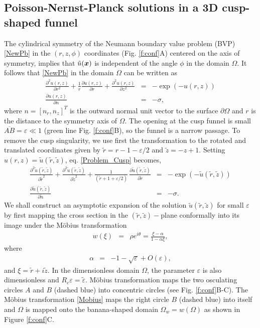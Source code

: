 \documentclass[12pt]{article}
\newcommand{\ds}{\displaystyle}
\newcommand{\beq}{\begin{eqnarray}}
\newcommand{\eeq}{\end{eqnarray}}
\newcommand{\p}{\partial}
\newcommand{\eps}{\varepsilon}
\newcommand{\x}{\mbox{\boldmath$x$}}
\begin{document}
\subsection{Poisson-Nernst-Planck solutions in a 3D cusp-shaped funnel}\label{s:Reduction_cplx}
The cylindrical symmetry of the Neumann boundary value problem (BVP) \eqref{NewPb} in the $(r,z,\phi)$  coordinates (Fig. \ref{f:conf}A) centered on the axis of symmetry, implies that $\tilde u(\x)$ is independent of the angle $\phi$ in the domain $\Omega$. It follows that \eqref{NewPb} in the domain $\Omega$ can be written as
\beq\label{Problem_Cusp}
\frac{\p^2 u(r,z)}{\p r^2}+\frac{1}{r}\frac{\p u(r,z)}{\p r }+\frac{\p^2 u(r,z)}{\p z^2}&=&-\exp(-u(r,z))\\
\frac{\p u(r,z)}{\p n}&=&-\sigma,\nonumber
\eeq
where $n=[n_r,n_z]^T$ is the outward normal unit vector to the surface $\p \Omega$ and $r$ is the distance to the symmetry axis of $\Omega$. %
The opening at the cusp funnel is small $\overline{AB}= \eps\ll1 $ (green line Fig. \ref{f:conf}B), so the funnel is a narrow passage.
To remove the cusp singularity, we use first the transformation to the rotated and translated coordinates given by $\ds\tilde{r}=r-1-\eps/2$ and $\tilde z = -z+1$. Setting $u(r,z)=\tilde u ( \tilde r, \tilde z )$, eq. \eqref{Problem_Cusp} becomes,
\beq\label{Problem_Cusp2}
\frac{\p^2 \tilde  u(\tilde r,\tilde z)}{\p \tilde r^2}+\frac{\p^2  \tilde u(\tilde r,\tilde z)}{\p \tilde z^2}+\frac{1}{(\tilde r+1+\eps/2)}\,\frac{\p  \tilde u(\tilde r,\tilde z)}{\p \tilde r }&=&-\exp(- \tilde u(\tilde r,\tilde z))\\
\frac{\p \tilde  u(\tilde r,\tilde z)}{\p \tilde n}&=&-\sigma.\nonumber
\eeq
We shall construct an asymptotic expansion of the solution $ \tilde u(\tilde r,\tilde z)$ for small $\eps$ by first mapping the cross section in the $(\tilde r,\tilde z)-$plane conformally into its image under the M\"obius transformation \cite{HS2012}
\beq\label{Mobius}
w(\xi)&=&\rho e^{i\theta}=\frac{\xi-\alpha}{1-\alpha\xi},
\eeq
where
\beq
\alpha &=& -1-\sqrt{\eps}+O(\eps),
\eeq
and $\xi = \tilde r +i \tilde z$.  In the dimensionless domain $\Omega$, the parameter $\eps$ is also dimensionless and $R_c\eps=\tilde \eps$. M\"obius transformation maps the two osculating circles $A$ and $B$ (dashed blue) into concentric circles (see
Fig. \ref{f:conf}B-C). The M\"obius transformation \eqref{Mobius} maps the right circle $B$ (dashed blue) into itself and $\Omega$ is mapped onto the banana-shaped domain $\Omega_w=w(\Omega)$ as shown in Figure \ref{f:conf}C.\\
\end{document}
